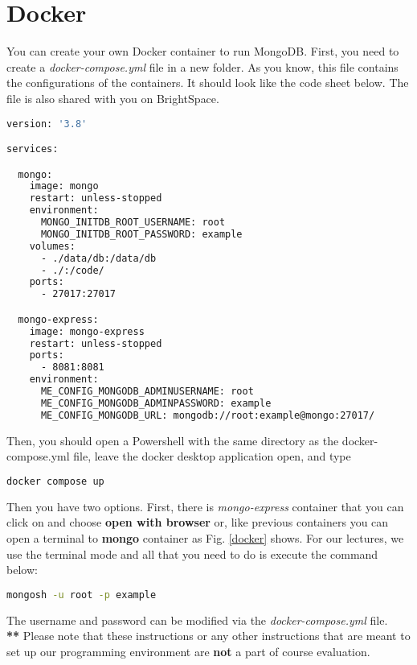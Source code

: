 \documentclass{homework}
\begin{document}
\section*{Docker}
You can create your own Docker container to run MongoDB. First, you need to create a \textit{docker-compose.yml} file in a new folder. As you know, this file contains the configurations of the containers. It should look like the code sheet below. The file is also shared with you on BrightSpace.
\begin{lstlisting}[language=bash]
version: '3.8'

services:

  mongo:
    image: mongo
    restart: unless-stopped
    environment:
      MONGO_INITDB_ROOT_USERNAME: root
      MONGO_INITDB_ROOT_PASSWORD: example
    volumes:
      - ./data/db:/data/db
      - ./:/code/
    ports:
      - 27017:27017

  mongo-express:
    image: mongo-express
    restart: unless-stopped
    ports:
      - 8081:8081
    environment:
      ME_CONFIG_MONGODB_ADMINUSERNAME: root
      ME_CONFIG_MONGODB_ADMINPASSWORD: example
      ME_CONFIG_MONGODB_URL: mongodb://root:example@mongo:27017/
\end{lstlisting}
Then, you should open a Powershell with the same directory as the docker-compose.yml file, leave the docker desktop application open, and type
\begin{lstlisting}[language=bash]
docker compose up
\end{lstlisting}
Then you have two options. First, there is \textit{mongo-express} container that you can click on and choose \textbf{open with browser} or, like previous containers you can open a terminal to \textbf{mongo} container as Fig. \ref{docker} shows.
For our lectures, we use the terminal mode and all that you need to do is execute the command below:
\begin{lstlisting}[language=bash]
mongosh -u root -p example
\end{lstlisting}
The username and password can be modified via the \textit{docker-compose.yml} file.
\newline\\
\textbf{**} Please note that these instructions or any other instructions that are meant to set up our programming environment are \textbf{not} a part of course evaluation.
\end{document}
